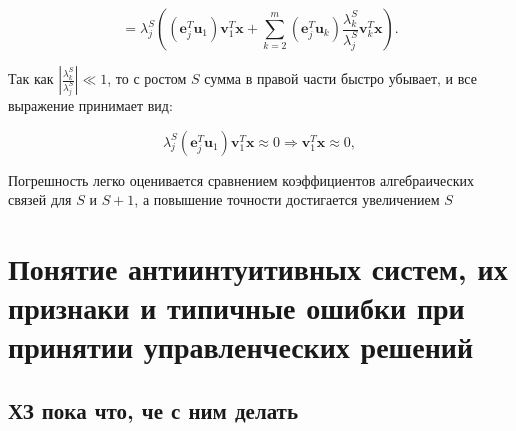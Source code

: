 	\[
	= \lambda_j^S \left( \left( \mathbf{e}_j^T \mathbf{u}_1 \right) \mathbf{v}_1^T \mathbf{x} + \sum_{k=2}^{m} \left( \mathbf{e}_j^T \mathbf{u}_k \right) \frac{\lambda_k^S}{\lambda_j^S} \mathbf{v}_k^T \mathbf{x} \right).
	\]
	
	Так как $\left| \frac{\lambda_k^S}{\lambda_j^S} \right| \ll 1$, то с ростом $S$ сумма в правой части быстро убывает, и все выражение принимает вид:
	
	\begin{equation}
		\lambda_j^S \left( \mathbf{e}_j^T \mathbf{u}_1 \right) \mathbf{v}_1^T \mathbf{x} \approx 0 \Rightarrow \mathbf{v}_1^T \mathbf{x} \approx 0,
	\end{equation}
	
	Погрешность легко оценивается сравнением коэффициентов алгебраических связей для $S$ и $S+1$, а повышение точности достигается увеличением $S$
	
	\newpage
	
	\section{Понятие антиинтуитивных систем, их признаки и типичные ошибки при принятии управленческих решений}
	
	\subsection{ХЗ пока что, че с ним делать}
	
